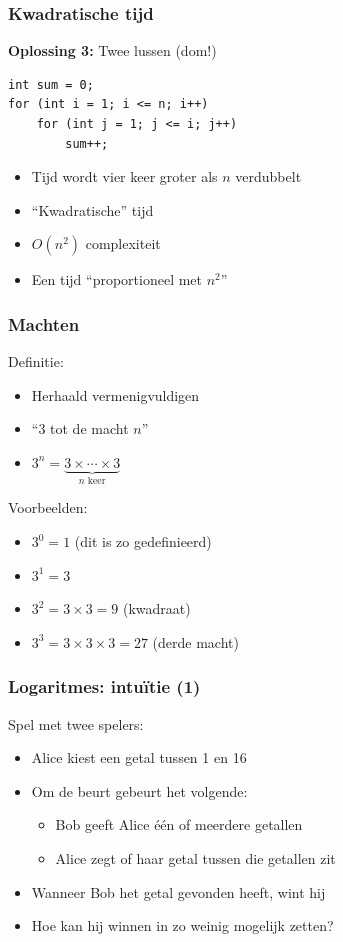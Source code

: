 \documentclass[12pt]{beamer}
\begin{document}
\begin{frame}[fragile]
\frametitle{Kwadratische tijd}
\textbf{Oplossing 3:} Twee lussen (dom!)
\begin{lstlisting}
int sum = 0;
for (int i = 1; i <= n; i++)
    for (int j = 1; j <= i; j++)
        sum++;
\end{lstlisting}
\begin{itemize}
\item Tijd wordt vier keer groter als $n$ verdubbelt
\item ``Kwadratische'' tijd
\item  $O(n^2)$ complexiteit
\item Een tijd ``proportioneel met $n^2$''
\end{itemize}
\end{frame}

\begin{frame}
\frametitle{Machten}
Definitie:
\begin{itemize}
\item Herhaald vermenigvuldigen
\item ``3 tot de macht $n$''
\item $3^n = \underbrace{3\times\cdots\times3}_\text{$n$ keer}$
\end{itemize}
Voorbeelden:
\begin{itemize}
\item $3^0 = 1$ (dit is zo gedefinieerd)
\item $3^1 = 3$
\item $3^2 = 3 \times 3 = 9$ (kwadraat)
\item $3^3 = 3 \times 3 \times 3 = 27$ (derde macht)
\end{itemize}
\end{frame}

\begin{frame}
\frametitle{Logaritmes: intuïtie (1)}
Spel met twee spelers:
\begin{itemize}
\item Alice kiest een getal tussen 1 en 16
\item Om de beurt gebeurt het volgende:
    \begin{itemize}
    \item Bob geeft Alice één of meerdere getallen
    \item Alice zegt of haar getal tussen die getallen zit
    \end{itemize}
\item Wanneer Bob het getal gevonden heeft, wint hij
\item Hoe kan hij winnen in zo weinig mogelijk zetten?
\end{itemize}
\end{frame}
\end{document}
